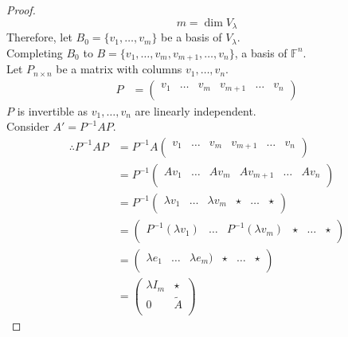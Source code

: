 \documentclass[fleqn, a4paper, 12pt]{article}
\theoremstyle{definition}
\theoremstyle{theorem}
\theoremstyle{remark}
\numberwithin{corollary}{theorem}
\numberwithin{equation}{theorem}
\begin{document}
\begin{proof}
	\begin{equation*}
		m = \dim V_\lambda
	\end{equation*}
	Therefore, let $B_0 = \{v_1, \dots, v_m\}$ be a basis of $V_\lambda$.\\
	Completing $B_0$ to $B = \{v_1, \dots, v_m, v_{m+1}, \dots, v_n\}$, a basis of $\mathbb{F}^n$. \\
	Let $P_{n \times n}$ be a matrix with columns $v_1, \dots, v_n$.
	\begin{align*}
		P &=
		\begin{pmatrix}
			v_1 & \dots & v_m & v_{m+1} & \dots & v_n\\
		\end{pmatrix}
	\end{align*}
	$P$ is invertible as $v_1, \dots, v_n$ are linearly independent.\\
	Consider $A' = P^{-1} A P$.
	\begin{align*}
		\therefore P^{-1} A P &= P^{-1} A 
			\begin{pmatrix}
				v_1 & \dots & v_m & v_{m+1} & \dots & v_n\\
			\end{pmatrix}\\
			&= P^{-1}
				\begin{pmatrix}
					A v_1 & \dots & A v_m & A v_{m+1} & \dots & A v_n\\
				\end{pmatrix}\\
			&= P^{-1} 
				\begin{pmatrix}
					\lambda v_1 & \dots & \lambda v_m & \star & \dots & \star\\
				\end{pmatrix}\\
			&= 
				\begin{pmatrix}
					P^{-1} (\lambda v_1) & \dots & P^{-1} (\lambda v_m) & \star & \dots & \star\\
				\end{pmatrix}\\
			&= 
				\begin{pmatrix}
					\lambda e_1 & \dots & \lambda e_m) & \star & \dots & \star\\
				\end{pmatrix}\\
			&=
				\begin{pmatrix}
					\lambda I_m & \star\\
					0 & \widetilde{A}\\

\end{pmatrix}
\end{align*}
\end{proof}
\end{document}
